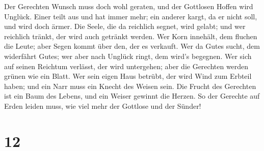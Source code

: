 Der Gerechten Wunsch muss doch wohl geraten, und der Gottlosen Hoffen
wird Unglück.  Einer teilt aus und hat immer mehr; ein
anderer kargt, da er nicht soll, und wird doch ärmer. 
Die Seele, die da reichlich segnet, wird gelabt; und wer reichlich
tränkt, der wird auch getränkt werden.  Wer Korn
innehält, dem fluchen die Leute; aber Segen kommt über den, der es
verkauft.  Wer da Gutes sucht, dem widerfährt Gutes; wer
aber nach Unglück ringt, dem wird's begegnen.  Wer sich
auf seinen Reichtum verlässt, der wird untergehen; aber die Gerechten
werden grünen wie ein Blatt.  Wer sein eigen Haus
betrübt, der wird Wind zum Erbteil haben; und ein Narr muss ein Knecht
des Weisen sein.  Die Frucht des Gerechten ist ein Baum
des Lebens, und ein Weiser gewinnt die Herzen.  So der
Gerechte auf Erden leiden muss, wie viel mehr der Gottlose und der
Sünder!

\hypertarget{section-11}{%
\section{12}\label{section-11}}

